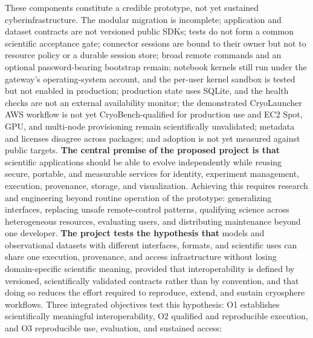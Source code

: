 These components constitute a credible prototype, not yet sustained
cyberinfrastructure. The modular migration is incomplete; application and
dataset contracts are not versioned public SDKs; tests do not form a common
scientific acceptance gate; connector sessions are bound to their owner but
not to resource policy or a durable session store; broad remote commands and
an optional password-bearing bootstrap remain; notebook kernels still run under
the gateway's operating-system account, and the per-user kernel sandbox is
tested but not enabled in production; production state uses SQLite, and the
health checks are not an external availability monitor; the demonstrated CryoLauncher AWS workflow is not yet
CryoBench-qualified for production use and EC2 Spot, GPU, and multi-node
provisioning remain scientifically unvalidated; metadata and licenses
disagree across packages; and adoption is not yet measured against public
targets.
\textbf{The central premise of the proposed project is that} scientific
applications should be able to evolve independently while reusing secure,
portable, and measurable services for identity, experiment management,
execution, provenance, storage, and visualization. Achieving this requires
research and engineering beyond routine operation of the prototype:
generalizing interfaces, replacing unsafe remote-control patterns, qualifying
science across heterogeneous resources, evaluating users, and distributing
maintenance beyond one developer. \textbf{The project tests the hypothesis
that} models and observational datasets with different interfaces, formats,
and scientific uses can share one execution, provenance, and access
infrastructure without losing domain-specific scientific meaning, provided
that interoperability is defined by versioned, scientifically validated
contracts rather than by convention, and that doing so reduces the effort
required to reproduce, extend, and sustain cryosphere workflows. Three
integrated objectives test this hypothesis: O1 establishes scientifically
meaningful interoperability, O2 qualified and reproducible execution, and O3
reproducible use, evaluation, and sustained access:

